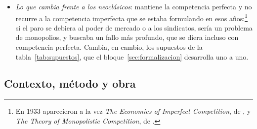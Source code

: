 \documentclass[11pt]{article}
\begin{document}
\begin{itemize}
\item \emph{Lo que cambia frente a los neoclásicos}:  mantiene la competencia perfecta y no recurre a la competencia imperfecta que se estaba formulando en esos años:\footnote{En 1933 aparecieron a la vez \emph{The Economics of Imperfect Competition}, de \nocite{Robinson1933Economics}, y \emph{The Theory of Monopolistic Competition}, de \nocite{Chamberlin1933Theory} .} si el paro se debiera al poder de mercado o a los sindicatos, sería un problema de monopolios, y  buscaba un fallo más profundo, que se diera incluso con competencia perfecta\nocite{DeVroey2016History}. Cambia, en cambio, los supuestos de la tabla~\ref{tab:supuestos}, que el bloque~\ref{sec:formalizacion} desarrolla uno a uno.
\end{itemize}

\subsection{Contexto, método y obra}\label{sec:contexto}
\end{document}
